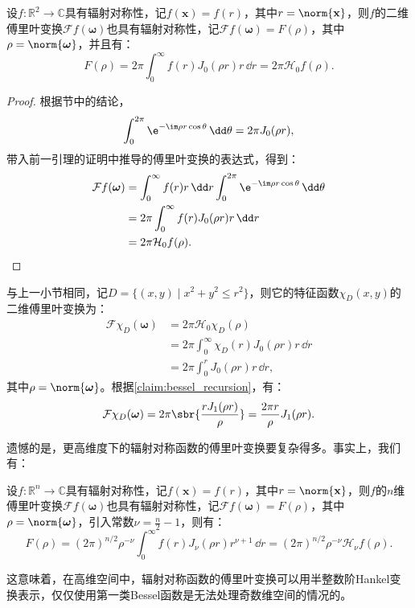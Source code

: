 \begin{theorem}
    设$f:\mathbb{R}^2\to\mathbb{C}$具有辐射对称性，记$f(\mathbf{x})=f(r)$，其中$r=\norm{\mathbf{x}}$，则$f$的二维傅里叶变换$\mathcal{F}f(\boldsymbol{\omega})$也具有辐射对称性，记$\mathcal{F}f(\boldsymbol{\omega})=F(\rho)$，其中$\rho=\norm{\boldsymbol{\omega}}$，并且有：
    \begin{equation}
        F(\rho)=2\pi\int_0^{\infty}f(r)J_0(\rho r)r\,\dd r=2\pi\mathcal{H}_0 f(\rho).
    \end{equation}
\end{theorem}
\begin{proof}
    根据节中的结论，
    \begin{equation}
        \int_{0}^{2\pi}\e^{-\im\rho r\cos\theta}\,\dd\theta=2\pi J_0(\rho r),
    \end{equation}
    带入前一引理的证明中推导的傅里叶变换的表达式，得到：
    \begin{align}
        \mathcal{F}f(\boldsymbol{\omega})&=\int_0^{\infty}f(r)r\,\dd r\int_0^{2\pi}\e^{-\im\rho r\cos\theta}\,\dd\theta\nonumber\\
        &=2\pi\int_0^{\infty}f(r)J_0(\rho r)r\,\dd r\nonumber\\
        &=2\pi\mathcal{H}_0 f(\rho).
    \end{align}
\end{proof}

\begin{example}[圆形特征函数的傅里叶变换]
    与上一小节相同，记$D=\{(x,y)\mid x^2+y^2\leq r^2\}$，则它的特征函数$\chi_D(x,y)$的二维傅里叶变换为：
    \begin{align}
        \mathcal{F}\chi_D(\boldsymbol{\omega})&=2\pi\mathcal{H}_0 \chi_D(\rho)\nonumber\\
        &=2\pi\int_0^{\infty}\chi_D(r)J_0(\rho r)r\,\dd r\nonumber\\
        &=2\pi\int_0^{r}J_0(\rho r)r\,\dd r,
    \end{align}
    其中$\rho=\norm{\boldsymbol{\omega}}$。根据\cref{claim:bessel_recursion}，有：
    \begin{equation}
        \mathcal{F}\chi_D(\boldsymbol{\omega})=2\pi\sbr{\frac{rJ_1(\rho r)}{\rho}}=\frac{2\pi r}{\rho}J_1(\rho r).
    \end{equation}
\end{example}

遗憾的是，更高维度下的辐射对称函数的傅里叶变换要复杂得多。事实上，我们有：
\begin{claim}
    设$f:\mathbb{R}^n\to\mathbb{C}$具有辐射对称性，记$f(\mathbf{x})=f(r)$，其中$r=\norm{\mathbf{x}}$，则$f$的$n$维傅里叶变换$\mathcal{F}f(\boldsymbol{\omega})$也具有辐射对称性，记$\mathcal{F}f(\boldsymbol{\omega})=F(\rho)$，其中$\rho=\norm{\boldsymbol{\omega}}$，引入常数$\displaystyle\nu=\frac{n}{2}-1$，则有：
    \begin{equation}
        F(\rho)=(2\pi)^{n/2}\rho^{-\nu}\int_0^{\infty}f(r)J_{\nu}(\rho r)r^{\nu+1}\,\dd r=(2\pi)^{n/2}\rho^{-\nu}\mathcal{H}_\nu f(\rho).
    \end{equation}
\end{claim}

这意味着，在高维空间中，辐射对称函数的傅里叶变换可以用半整数阶Hankel变换表示，仅仅使用第一类Bessel函数是无法处理奇数维空间的情况的。
